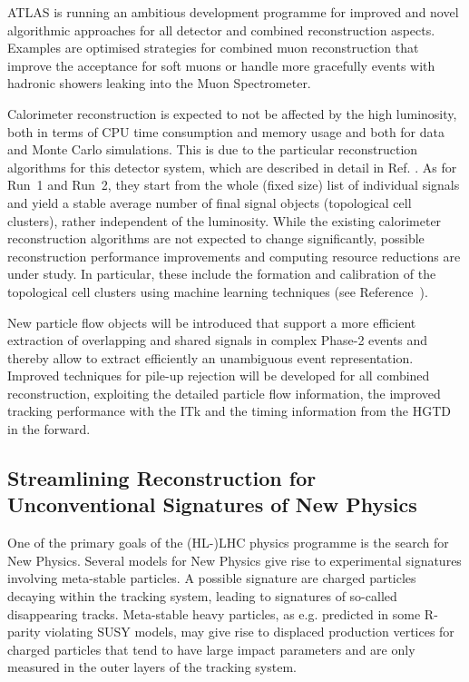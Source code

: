 ATLAS is running an ambitious development programme for improved and novel algorithmic approaches for all detector and combined reconstruction aspects. Examples are optimised strategies for combined muon reconstruction that improve the acceptance for soft muons or handle more gracefully events with hadronic showers leaking into the Muon Spectrometer.

Calorimeter reconstruction is expected to not be affected by the high luminosity, both in terms of CPU time consumption and memory usage and both for data and Monte Carlo simulations.
This is due to the particular reconstruction algorithms for this detector system, which are described in detail in Ref. \cite{Aad:2016upy}. As for Run~1 and Run~2, they start from the whole (fixed size) list of individual signals and yield a stable average number of final signal objects (topological cell clusters), rather independent of the luminosity. 
While the existing calorimeter reconstruction algorithms are not expected to change significantly,
possible reconstruction performance improvements and computing resource reductions are under study. 
In particular, these include the formation and calibration of the topological cell clusters using machine learning techniques (see Reference~\cite{PERF-2014-07}).

New particle flow \cite{PERF-2015-09} objects will be introduced that support a more efficient extraction of overlapping and shared signals in complex Phase-2 events and thereby allow to extract efficiently an unambiguous event representation. Improved techniques for pile-up rejection will be developed for all combined reconstruction, exploiting the detailed particle flow information, the improved tracking performance with the ITk and the timing information from the HGTD in the forward. 


\subsection{Streamlining Reconstruction for Unconventional Signatures of New Physics}
\label{sec:reco-unconvsig}

One of the primary goals of the (HL-)LHC physics programme is the search for New Physics. Several models for New Physics give rise to experimental signatures involving meta-stable particles. A possible signature are charged particles decaying within the tracking system, leading to signatures of so-called disappearing tracks. Meta-stable heavy particles, as e.g. predicted in some R-parity violating SUSY models, may give rise to displaced production vertices for charged particles that tend to have large impact parameters and are only measured in the outer layers of the tracking system.

